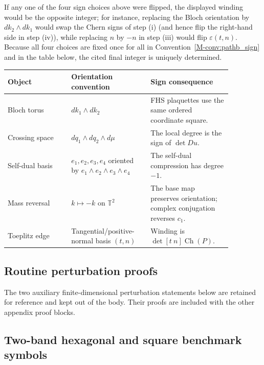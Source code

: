 \documentclass[11pt]{article}
\numberwithin{equation}{section}
\theoremstyle{definition}
\theoremstyle{remark}
\newcommand{\Ch}{\operatorname{Ch}}
\begin{document}
If any one of the four sign choices above were flipped, the displayed winding would be the
opposite integer; for instance, replacing the Bloch orientation by \(dk_2\wedge dk_1\) would
swap the Chern signs of step (i) (and hence flip the right-hand side in step (iv)), while
replacing \(n\) by \(-n\) in step (iii) would flip \(\varepsilon(t,n)\). Because all four
choices are fixed once for all in Convention~\ref{M-conv:pathb_sign} and in the table below,
the cited final integer is uniquely determined.
\begin{center}
\small
\begin{tabular}{>{\raggedright\arraybackslash}p{0.25\linewidth}
                >{\raggedright\arraybackslash}p{0.30\linewidth}
                >{\raggedright\arraybackslash}p{0.32\linewidth}}
\toprule
Object & Orientation convention & Sign consequence \\
\midrule
Bloch torus & \(dk_1\wedge dk_2\) & FHS plaquettes use the same ordered coordinate square. \\
Crossing space & \(dq_1\wedge dq_2\wedge d\mu\) & The local degree is the sign of \(\det Du\). \\
Self-dual basis & \(e_1,e_2,e_3,e_4\) oriented by \(e_1\wedge e_2\wedge e_3\wedge e_4\) & The self-dual compression has degree \(-1\). \\
Mass reversal & \(k\mapsto -k\) on \(\mathbb T^2\) & The base map preserves orientation; complex conjugation reverses \(c_1\). \\
Toeplitz edge & Tangential/positive-normal basis \((t,n)\) & Winding is \(\det[t\ n]\Ch(P)\). \\
\bottomrule
\end{tabular}
\end{center}
\subsection{Routine perturbation proofs}\label{app:routine_perturbation_proofs}
The two auxiliary finite-dimensional perturbation statements below are retained for reference and
kept out of the body. Their proofs are included with the other appendix proof blocks.
\subsection{Two-band hexagonal and square benchmark symbols}\label{app:benchmark_hex_square}\label{app:benchmark_hexagonal}\label{app:benchmark_square}
\end{document}
